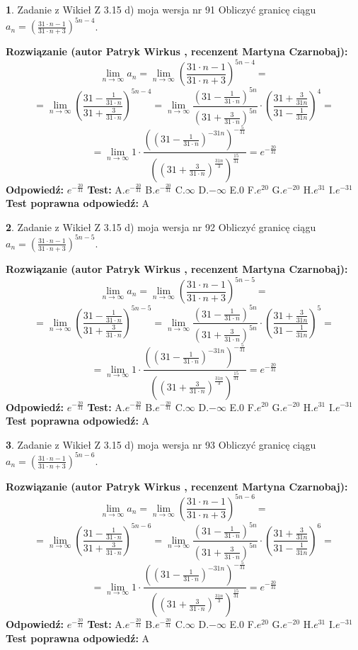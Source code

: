 \documentclass[12pt, a4paper]{article}
\theoremstyle{definition} %
\newtheorem{zad}{}
\newcommand{\zadStart}[1]{\begin{zad}#1\newline}
\newcommand{\zadStop}{\end{zad}}
\newcommand{\rozwStart}[2]{\noindent \textbf{Rozwiązanie (autor #1 , recenzent #2): }\newline}
\newcommand{\rozwStop}{\newline}
\newcommand{\odpStart}{\noindent \textbf{Odpowiedź:}\newline}
\newcommand{\odpStop}{\newline}
\newcommand{\testStart}{\noindent \textbf{Test:}\newline}
\newcommand{\testStop}{\newline}
\newcommand{\kluczStart}{\noindent \textbf{Test poprawna odpowiedź:}\newline}
\newcommand{\kluczStop}{\newline}
\begin{document}
\zadStart{Zadanie z Wikieł Z 3.15 d) moja wersja nr 91}
Obliczyć granicę ciągu $a_{n}=(\frac{31\cdot n - 1}{31 \cdot n + 3})^{5n-4}$.
\zadStop
\rozwStart{Patryk Wirkus}{Martyna Czarnobaj}
$$\lim\limits_{n\to\infty} a_{n} = \lim\limits_{n\to\infty}(\frac{31\cdot n - 1}{31 \cdot n + 3})^{5n-4}=$$
$$=\lim\limits_{n\to\infty}(\frac{31 - \frac{1}{31\cdot n}}{31 + \frac{3}{31 \cdot n}})^{5n-4}=\lim\limits_{n\to\infty}\frac{(31 - \frac{1}{31\cdot n})^{5n}}{(31 + \frac{3}{31\cdot n})^{5n}} \cdot (\frac{31+\frac{3}{31n}}{31-\frac{1}{31n}})^{4}=$$
$$=\lim\limits_{n\to\infty} 1 \cdot \frac{((31-\frac{1}{31 \cdot n})^{-31n})^{-\frac{5}{31}}}{((31+\frac{3}{31 \cdot n})^{\frac{31n}{3}})^{\frac{15}{31}}} =e^{-\frac{20}{31}}$$
\rozwStop
\odpStart
$e^{-\frac{20}{31}}$
\odpStop
\testStart
A.$ e^{-\frac{20}{31}}$
B.$ e^{-\frac{20}{31}}$
C.$\infty$
D.$-\infty$
E.$0$
F.$e^{20}$
G.$e^{-20}$
H.$e^{31}$
I.$e^{-31}$
\testStop
\kluczStart
A
\kluczStop



\zadStart{Zadanie z Wikieł Z 3.15 d) moja wersja nr 92}
Obliczyć granicę ciągu $a_{n}=(\frac{31\cdot n - 1}{31 \cdot n + 3})^{5n-5}$.
\zadStop
\rozwStart{Patryk Wirkus}{Martyna Czarnobaj}
$$\lim\limits_{n\to\infty} a_{n} = \lim\limits_{n\to\infty}(\frac{31\cdot n - 1}{31 \cdot n + 3})^{5n-5}=$$
$$=\lim\limits_{n\to\infty}(\frac{31 - \frac{1}{31\cdot n}}{31 + \frac{3}{31 \cdot n}})^{5n-5}=\lim\limits_{n\to\infty}\frac{(31 - \frac{1}{31\cdot n})^{5n}}{(31 + \frac{3}{31\cdot n})^{5n}} \cdot (\frac{31+\frac{3}{31n}}{31-\frac{1}{31n}})^{5}=$$
$$=\lim\limits_{n\to\infty} 1 \cdot \frac{((31-\frac{1}{31 \cdot n})^{-31n})^{-\frac{5}{31}}}{((31+\frac{3}{31 \cdot n})^{\frac{31n}{3}})^{\frac{15}{31}}} =e^{-\frac{20}{31}}$$
\rozwStop
\odpStart
$e^{-\frac{20}{31}}$
\odpStop
\testStart
A.$ e^{-\frac{20}{31}}$
B.$ e^{-\frac{20}{31}}$
C.$\infty$
D.$-\infty$
E.$0$
F.$e^{20}$
G.$e^{-20}$
H.$e^{31}$
I.$e^{-31}$
\testStop
\kluczStart
A
\kluczStop



\zadStart{Zadanie z Wikieł Z 3.15 d) moja wersja nr 93}
Obliczyć granicę ciągu $a_{n}=(\frac{31\cdot n - 1}{31 \cdot n + 3})^{5n-6}$.
\zadStop
\rozwStart{Patryk Wirkus}{Martyna Czarnobaj}
$$\lim\limits_{n\to\infty} a_{n} = \lim\limits_{n\to\infty}(\frac{31\cdot n - 1}{31 \cdot n + 3})^{5n-6}=$$
$$=\lim\limits_{n\to\infty}(\frac{31 - \frac{1}{31\cdot n}}{31 + \frac{3}{31 \cdot n}})^{5n-6}=\lim\limits_{n\to\infty}\frac{(31 - \frac{1}{31\cdot n})^{5n}}{(31 + \frac{3}{31\cdot n})^{5n}} \cdot (\frac{31+\frac{3}{31n}}{31-\frac{1}{31n}})^{6}=$$
$$=\lim\limits_{n\to\infty} 1 \cdot \frac{((31-\frac{1}{31 \cdot n})^{-31n})^{-\frac{5}{31}}}{((31+\frac{3}{31 \cdot n})^{\frac{31n}{3}})^{\frac{15}{31}}} =e^{-\frac{20}{31}}$$
\rozwStop
\odpStart
$e^{-\frac{20}{31}}$
\odpStop
\testStart
A.$ e^{-\frac{20}{31}}$
B.$ e^{-\frac{20}{31}}$
C.$\infty$
D.$-\infty$
E.$0$
F.$e^{20}$
G.$e^{-20}$
H.$e^{31}$
I.$e^{-31}$
\testStop
\kluczStart
A
\kluczStop
\end{document}
